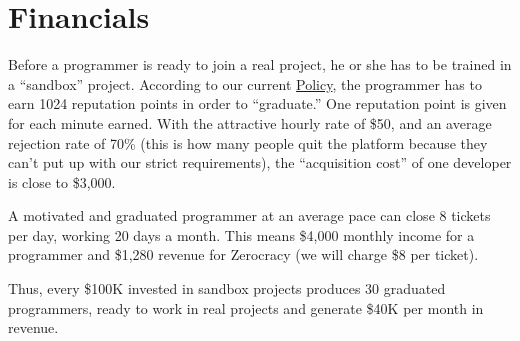 \documentclass{main}
\begin{document}
\section{Financials}

Before a programmer is ready to join a real project, he or she has to be
trained in a ``sandbox'' project. According to our current \href{http://www.zerocracy.com/policy.html}{Policy},
the programmer has to earn 1024 reputation points in order to ``graduate.''
One reputation point is given for each minute earned. With the attractive
hourly rate of \$50, and an average rejection rate of 70\% (this is how many
people quit the platform because they can't put up with our strict requirements),
the ``acquisition cost'' of one developer is close to \$3,000.

A motivated and graduated programmer at an average pace can close 8 tickets per day,
working 20 days a month. This means \$4,000 monthly income for a programmer
and \$1,280 revenue for Zerocracy (we will charge \$8 per ticket).

Thus, every \$100K invested in sandbox projects produces 30 graduated programmers,
ready to work in real projects and generate \$40K per month in revenue.
\end{document}
